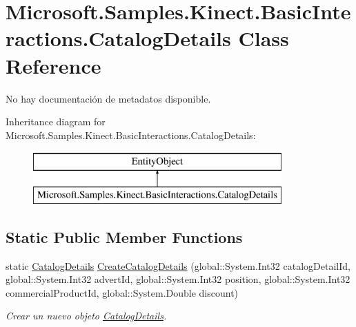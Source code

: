 \hypertarget{class_microsoft_1_1_samples_1_1_kinect_1_1_basic_interactions_1_1_catalog_details}{\section{Microsoft.\-Samples.\-Kinect.\-Basic\-Interactions.\-Catalog\-Details Class Reference}
\label{class_microsoft_1_1_samples_1_1_kinect_1_1_basic_interactions_1_1_catalog_details}
}


No hay documentación de metadatos disponible.  


Inheritance diagram for Microsoft.\-Samples.\-Kinect.\-Basic\-Interactions.\-Catalog\-Details\-:\begin{figure}[H]
\begin{center}
\leavevmode
\includegraphics[height=2.000000cm]{class_microsoft_1_1_samples_1_1_kinect_1_1_basic_interactions_1_1_catalog_details}
\end{center}
\end{figure}
\subsection*{Static Public Member Functions}
\begin{DoxyCompactItemize}
\item 
static \hyperlink{class_microsoft_1_1_samples_1_1_kinect_1_1_basic_interactions_1_1_catalog_details}{Catalog\-Details} \hyperlink{class_microsoft_1_1_samples_1_1_kinect_1_1_basic_interactions_1_1_catalog_details_a054013936f29bc8f0a15b5bf3d884b18}{Create\-Catalog\-Details} (global\-::\-System.\-Int32 catalog\-Detail\-Id, global\-::\-System.\-Int32 advert\-Id, global\-::\-System.\-Int32 position, global\-::\-System.\-Int32 commercial\-Product\-Id, global\-::\-System.\-Double discount)
\begin{DoxyCompactList}\small\item\em Crear un nuevo objeto \hyperlink{class_microsoft_1_1_samples_1_1_kinect_1_1_basic_interactions_1_1_catalog_details}{Catalog\-Details}. \end{DoxyCompactList}\end{DoxyCompactItemize}
